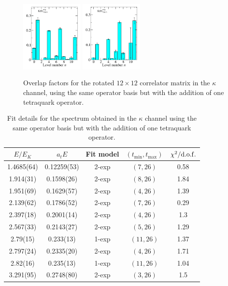 \begin{figure}
  \includegraphics[width=0.28\textwidth]{figures/spectrum_a1g/with_tq/zfactors/zfactor_kaon-P000-A1g_1-TDO_3.pdf}
  \includegraphics[width=0.28\textwidth]{figures/spectrum_a1g/with_tq/zfactors/zfactor_kaon-P000-A1g_1-TDU_5.pdf}
  \caption{Overlap factors for the rotated $12\times 12$ correlator matrix in the $\kappa$ channel, using the same operator basis but with the addition of one tetraquark operator.}
  \label{fig:kappa_with_tq_zfactors}
\end{figure}

\begin{table}
  \centering
  \begin{tabular}{c|c|c|c|c}
    $E / E_K$ & $a_t E$ & Fit model & $(t_{\mathrm{min}}, {t_\mathrm{max}})$ & $\chi^2 / \rm{d.o.f.}$\\
    \hline
    1.4685(64)&0.12259(53)&2{-}exp&$(7, 26)$&0.58\\
    1.914(31)&0.1598(26)&2{-}exp&$(8, 26)$&1.84\\
    1.951(69)&0.1629(57)&2{-}exp&$(4, 26)$&1.39\\
    2.139(62)&0.1786(52)&2{-}exp&$(7, 26)$&0.29\\
    2.397(18)&0.2001(14)&2{-}exp&$(4, 26)$&1.3\\
    2.567(33)&0.2143(27)&2{-}exp&$(5, 26)$&1.29\\
    2.79(15)&0.233(13)&1{-}exp&$(11, 26)$&1.37\\
    2.797(24)&0.2335(20)&2{-}exp&$(4, 26)$&1.71\\
    2.82(16)&0.235(13)&1{-}exp&$(11, 26)$&1.04\\
    3.291(95)&0.2748(80)&2{-}exp&$(3, 26)$&1.5
  \end{tabular}
  \caption{Fit details for the spectrum obtained in the $\kappa$ channel using the same operator basis but with the addition of one tetraquark operator.}
  \label{table:kappa_with_tq_spectrum}
\end{table}


